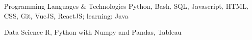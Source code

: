 

\begin{cvskills}

  \cvskill
    {Programming Languages \& Technologies} %
    {Python, Bash, SQL, Javascript, HTML, CSS, Git, VueJS, ReactJS; learning: Java} %

  \cvskill
    {Data Science} %
    {R, Python with Numpy and Pandas, Tableau} %

\end{cvskills}
